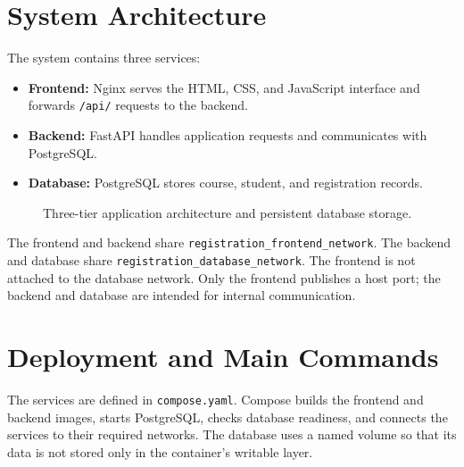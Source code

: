 \documentclass[11pt,a4paper]{article}
\begin{document}
\section{System Architecture}
The system contains three services:
\begin{itemize}[leftmargin=*]
  \item \textbf{Frontend:} Nginx serves the HTML, CSS, and JavaScript interface and forwards \texttt{/api/} requests to the backend.
  \item \textbf{Backend:} FastAPI handles application requests and communicates with PostgreSQL.
  \item \textbf{Database:} PostgreSQL stores course, student, and registration records.
\end{itemize}

\begin{figure}[H]
\centering
{}
\caption{Three-tier application architecture and persistent database storage.}
\end{figure}

The frontend and backend share \texttt{registration\_frontend\_network}. The backend and database share \texttt{registration\_database\_network}. The frontend is not attached to the database network. Only the frontend publishes a host port; the backend and database are intended for internal communication.

\section{Deployment and Main Commands}
The services are defined in \texttt{compose.yaml}. Compose builds the frontend and backend images, starts PostgreSQL, checks database readiness, and connects the services to their required networks. The database uses a named volume so that its data is not stored only in the container's writable layer.
\end{document}
